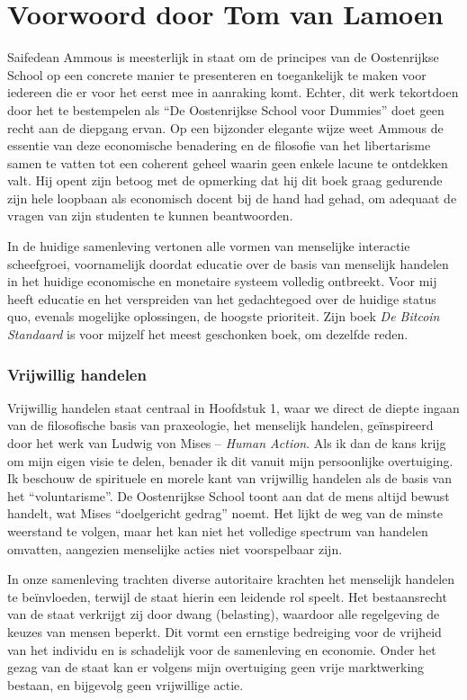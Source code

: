 \chapter{Voorwoord door Tom van Lamoen}

Saifedean Ammous is meesterlijk in staat om de principes van de Oostenrijkse School op een concrete manier te presenteren en toegankelijk te maken voor iedereen die er voor het eerst mee in aanraking komt. Echter, dit werk tekortdoen door het te bestempelen als \enquote{De Oostenrijkse School voor Dummies} doet geen recht aan de diepgang ervan. Op een bijzonder elegante wijze weet Ammous de essentie van deze economische benadering en de filosofie van het libertarisme samen te vatten tot een coherent geheel waarin geen enkele lacune te ontdekken valt. Hij opent zijn betoog met de opmerking dat hij dit boek graag gedurende zijn hele loopbaan als economisch docent bij de hand had gehad, om adequaat de vragen van zijn studenten te kunnen beantwoorden.

In de huidige samenleving vertonen alle vormen van menselijke interactie scheefgroei, voornamelijk doordat educatie over de basis van menselijk handelen in het huidige economische en monetaire systeem volledig ontbreekt. Voor mij heeft educatie en het verspreiden van het gedachtegoed over de huidige status quo, evenals mogelijke oplossingen, de hoogste prioriteit. Zijn boek \emph{De Bitcoin Standaard} is voor mijzelf het meest geschonken boek, om dezelfde reden.

\subsection{Vrijwillig handelen}

Vrijwillig handelen staat centraal in Hoofdstuk 1, waar we direct de diepte ingaan van de filosofische basis van praxeologie, het menselijk handelen, geïnspireerd door het werk van Ludwig von Mises -- \emph{Human Action}. Als ik dan de kans krijg om mijn eigen visie te delen, benader ik dit vanuit mijn persoonlijke overtuiging. Ik beschouw de spirituele en morele kant van vrijwillig handelen als de basis van het ``voluntarisme''. De Oostenrijkse School toont aan dat de mens altijd bewust handelt, wat Mises ``doelgericht gedrag'' noemt. Het lijkt de weg van de minste weerstand te volgen, maar het kan niet het volledige spectrum van handelen omvatten, aangezien menselijke acties niet voorspelbaar zijn.

In onze samenleving trachten diverse autoritaire krachten het menselijk handelen te beïnvloeden, terwijl de staat hierin een leidende rol speelt. Het bestaansrecht van de staat verkrijgt zij door dwang (belasting), waardoor alle regelgeving de keuzes van mensen beperkt. Dit vormt een ernstige bedreiging voor de vrijheid van het individu en is schadelijk voor de samenleving en economie. Onder het gezag van de staat kan er volgens mijn overtuiging geen vrije marktwerking bestaan, en bijgevolg geen vrijwillige actie.


